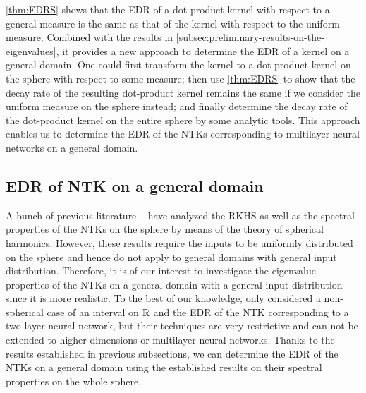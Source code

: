 \cref{thm:EDRS} shows that the EDR of a dot-product kernel with respect to a general measure is the same as that of the kernel with respect to the uniform measure.
Combined with the results in \cref{subsec:preliminary-results-on-the-eigenvalues},
it provides a new approach to determine the EDR of a kernel on a general domain.
One could first transform the kernel to a dot-product kernel on the sphere with respect to some measure;
then use \cref{thm:EDRS} to show that the decay rate of the resulting dot-product kernel remains the same if we consider the uniform measure on the sphere instead;
and finally determine the decay rate of the dot-product kernel on the entire sphere by some analytic tools.
This approach enables us to determine the EDR of the NTKs corresponding to multilayer neural networks on a general domain.


\subsection{EDR of NTK on a general domain}

A bunch of previous literature
~\citep{bietti2019_InductiveBias,chen2020_DeepNeural,geifman2020_SimilarityLaplace,bietti2020_DeepEquals}
have analyzed the RKHS as well as the spectral properties of the NTKs on the sphere by means of the theory of spherical harmonics.
However, these results require the inputs to be uniformly distributed on the sphere and hence do not apply to general domains with general input distribution.
Therefore, it is of our interest to investigate the eigenvalue properties of the NTKs on a general domain with a general input distribution since it is more realistic.
To the best of our knowledge,
only \citet{lai2023_GeneralizationAbility} considered a non-spherical case of an interval on $\mathbb{R}$
and the EDR of the NTK corresponding to a two-layer neural network,
but their techniques are very restrictive and can not be extended to higher dimensions or multilayer neural networks.
Thanks to the results established in previous subsections,
we can determine the EDR of the NTKs on a general domain using the established results on their spectral properties on the whole sphere.

